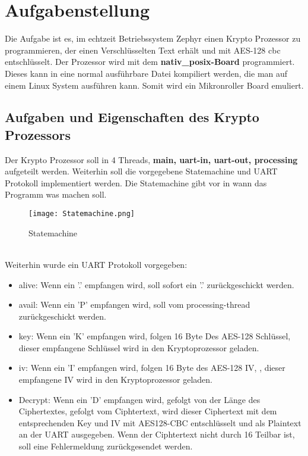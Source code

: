 \newpage
\section{Aufgabenstellung}
    Die Aufgabe ist es, im echtzeit Betriebssystem Zephyr einen Krypto Prozessor zu programmieren, der einen Verschlüsselten Text erhält und 
    mit AES-128 cbc entschlüsselt.
    Der Prozessor wird mit dem \textbf{nativ\_posix-Board} programmiert. Dieses kann in eine normal ausführbare Datei 
    kompiliert werden, die man auf einem Linux System ausführen kann. Somit wird ein Mikronroller Board emuliert.  
    \\ 
    

\subsection{Aufgaben und Eigenschaften des Krypto Prozessors}
    Der Krypto Prozessor soll in 4 Threads, \textbf{main, uart-in, uart-out, processing} aufgeteilt werden. Weiterhin soll die vorgegebene Statemachine und UART Protokoll implementiert werden. 
    Die Statemachine gibt vor in wann das Programm was machen soll. 
    \begin{figure}[!htb]
        \centering
        \texttt{[image: Statemachine.png]}
        \caption{Statemachine}
        \label{caption:Statemachine}
    \end{figure}
    \\
    Weiterhin wurde ein UART Protokoll vorgegeben: 
    \begin{itemize}
        \setlength\itemsep{0em}
        \item alive: Wenn ein '.' empfangen wird, soll sofort ein '.' zurückgeschickt werden. 
        \item avail: Wenn ein 'P' empfangen wird, soll vom processing-thread  zurückgeschickt werden. 
        \item key: Wenn ein 'K' empfangen wird, folgen 16 Byte Des AES-128 Schlüssel, dieser empfangene Schlüssel wird in den Kryptoprozessor geladen.  
        \item iv: Wenn ein 'I' empfangen wird, folgen 16 Byte des AES-128 IV, , dieser empfangene IV wird in den Kryptoprozessor geladen.
        \item Decrypt: Wenn ein 'D' empfangen wird, gefolgt von der Länge des Ciphertextes, gefolgt vom Ciphtertext, wird dieser Ciphertext mit dem 
        entsprechenden Key und IV mit AES128-CBC entschlüsselt und als Plaintext an der UART ausgegeben. 
        Wenn der Ciphtertext nicht durch 16 Teilbar ist, soll eine Fehlermeldung  zurückgesendet werden. 
    \end{itemize}
